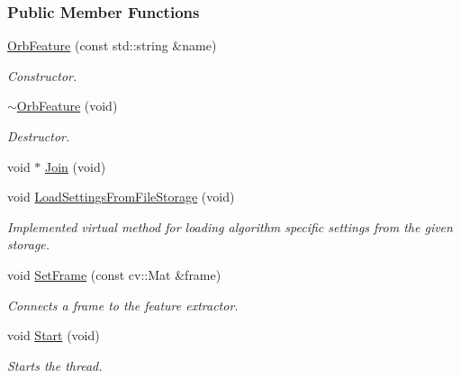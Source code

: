\subsubsection*{Public Member Functions}
\begin{DoxyCompactItemize}
\item 
\hyperlink{group___feature_extractor_a27e8b7a9c9ad36abd4119d1feb98f874}{Orb\-Feature} (const std\-::string \&name)
\begin{DoxyCompactList}\small\item\em Constructor. \end{DoxyCompactList}\item 
\hyperlink{group___feature_extractor_aed4e5d5b4410041d3c8374dbd929f2ef}{$\sim$\-Orb\-Feature} (void)
\begin{DoxyCompactList}\small\item\em Destructor. \end{DoxyCompactList}\item 
void $\ast$ \hyperlink{group___core_a8f33f7750321d5df9188033e7e3e300d}{Join} (void)
\item 
void \hyperlink{group___feature_extractor_aa13ad1fbc5869dcabb55611e5c206ebd}{Load\-Settings\-From\-File\-Storage} (void)
\begin{DoxyCompactList}\small\item\em Implemented virtual method for loading algorithm specific settings from the given storage. \end{DoxyCompactList}\item 
void \hyperlink{group___feature_extractor_af261b9c5cac5ff1fb628317c7009c845}{Set\-Frame} (const cv\-::\-Mat \&frame)
\begin{DoxyCompactList}\small\item\em Connects a frame to the feature extractor. \end{DoxyCompactList}\item 
void \hyperlink{group___core_a2b42f82341afd2747ea093b6ac8b91cb}{Start} (void)
\begin{DoxyCompactList}\small\item\em Starts the thread. \end{DoxyCompactList}\end{DoxyCompactItemize}
